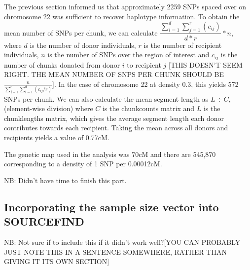 The previous section informed us that approximately 2259 SNPs spaced over on chromosome 22 was sufficient to recover haplotype information. To obtain the mean number of SNPs per chunk, we can calculate $\dfrac{\sum_{i=1}^{d} \sum_{j=1}^{r} (c_{ij})}{d*r} * n$, where $d$ is the number of donor individuals, $r$ is the number of recipient individuals, $n$ is the number of SNPs over the region of interest and $c_{ij}$ is the number of chunks donated from donor $i$ to recipient $j$ {\color{red}[THIS DOESN'T SEEM RIGHT. THE MEAN NUMBER OF SNPS PER CHUNK SHOULD BE $\frac{n}{\sum_{j=1}^{r} \sum_{i=1}^{d} (c_{ij}/r)}$]}. In the case of chromosome 22 at density 0.3, this yields 572 SNPs per chunk. We can also calculate the mean segment length as $L \div C$, (element-wise division) where $C$ is the chunkcounts matrix and $L$ is the  chunklengths matrix, which gives the average segment length each donor contributes towards each recipient. Taking the mean across all donors and recipients yields a value of 0.77cM. 

The genetic map used in the analysis was 70cM and there are 545,870 corresponding to a density of 1 SNP per 0.00012cM. 

NB: Didn't have time to finish this part. 


\subsection{Incorporating the sample size vector into SOURCEFIND}

NB: Not sure if to include this if it didn't work well?{\color{red}[YOU CAN PROBABLY JUST NOTE THIS IN A SENTENCE SOMEWHERE, RATHER THAN GIVING IT ITS OWN SECTION]}